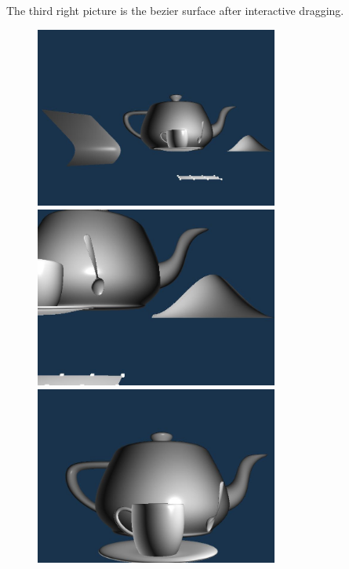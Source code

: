 \documentclass[acmtog]{acmart}
\begin{document}
The third right picture is the bezier surface after interactive dragging.
\begin{figure}[h]
	\centering
	{\includegraphics[width=8cm]{all_elements.JPG}}	
	{\includegraphics[width=8cm]{single_bezier.JPG}}
	{\includegraphics[width=8cm]{tea.JPG}}
\end{figure}
\end{document}
